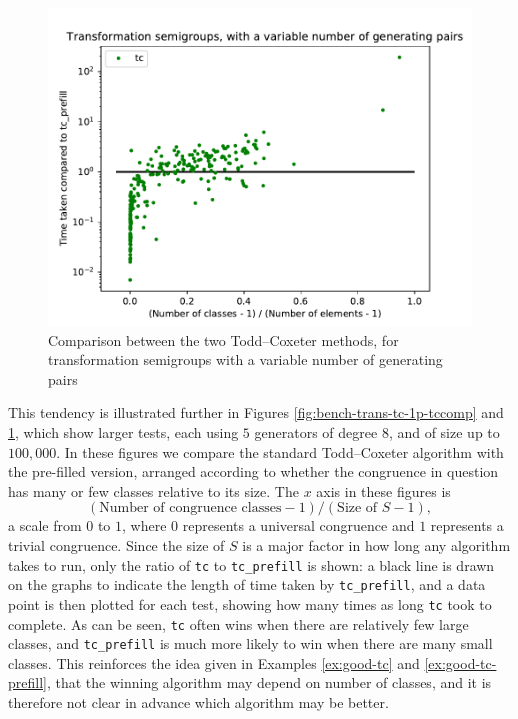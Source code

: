 \begin{figure}[h]
  \centering
  \includegraphics[width=\textwidth]{pics/ch-pairs/bench-trans-tc-vp-tccomp}
  \caption[Benchmark: Todd--Coxeter, concrete, $n$ pairs]
  {Comparison between the two Todd--Coxeter methods, for transformation
    semigroups with a variable number of generating pairs}
  \label{fig:bench-trans-tc-vp-tccomp}
\end{figure}

This tendency is illustrated further in Figures
\ref{fig:bench-trans-tc-1p-tccomp} and
\ref{fig:bench-trans-tc-vp-tccomp}, which show larger tests, each using $5$
generators of degree $8$, and of size up to $100,000$.  In these figures we
compare the standard Todd--Coxeter algorithm with the pre-filled version, arranged
according to whether the congruence in question has many or few classes relative
to its size.  The $x$ axis in these figures is
$$(\text{Number of congruence classes} - 1) / (\text{Size of~} S - 1),$$
a scale from $0$ to $1$, where $0$ represents a universal congruence and $1$
represents a trivial congruence.  Since the size of $S$ is a major factor in how
long any algorithm takes to run, only the ratio of \texttt{tc} to
\texttt{tc\_prefill} is shown: a black line is drawn on the graphs to indicate
the length of time taken by \texttt{tc\_prefill}, and a data point is then
plotted for each test, showing how many times as long \texttt{tc} took to
complete.  As can be seen, \texttt{tc} often wins when there are relatively few
large classes, and \texttt{tc\_prefill} is much more likely to win when there are
many small classes.  This reinforces the idea given in Examples \ref{ex:good-tc}
and \ref{ex:good-tc-prefill}, that the winning algorithm may depend on number of
classes, and it is therefore not clear in advance which algorithm may be better.

